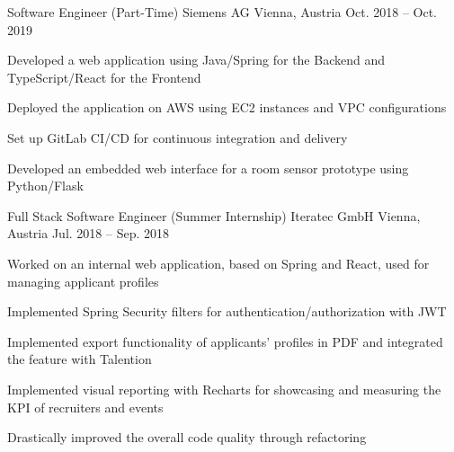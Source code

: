 


\begin{cventries}


\cventry
{Software Engineer (Part-Time)} %
{Siemens AG} %
{Vienna, Austria} %
{Oct. 2018 -- Oct. 2019} %
{ %
\begin{cvitems}
\item {Developed a web application using Java/Spring for the Backend and TypeScript/React for the Frontend}
\item {Deployed the application on AWS using EC2 instances and VPC configurations}
\item {Set up GitLab CI/CD for continuous integration and delivery}
\item {Developed an embedded web interface for a room sensor prototype using Python/Flask}
\end{cvitems}
}


\cventry
{Full Stack Software Engineer (Summer Internship)} %
{Iteratec GmbH} %
{Vienna, Austria} %
{Jul. 2018 -- Sep. 2018} %
{ %
\begin{cvitems}
\item {Worked on an internal web application, based on Spring and React, used for managing applicant profiles}
\item {Implemented Spring Security filters for authentication/authorization with JWT}
\item {Implemented export functionality of applicants' profiles in PDF and integrated the feature with Talention}
\item {Implemented visual reporting with Recharts for showcasing and measuring the KPI of recruiters and events}
\item {Drastically improved the overall code quality through refactoring}
\end{cvitems}
}


\end{cventries}
